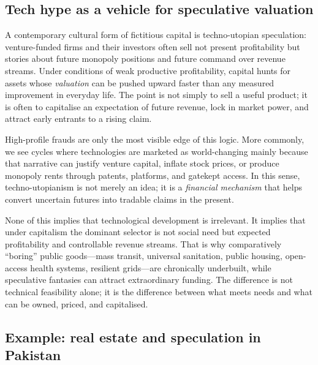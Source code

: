\subsection{Tech hype as a vehicle for speculative valuation}
\label{sec:tech-hype-fictitious}

A contemporary cultural form of fictitious capital is techno-utopian speculation: venture-funded firms and their investors often sell not present profitability but stories about future monopoly positions and future command over revenue streams. Under conditions of weak productive profitability, capital
hunts for assets whose \emph{valuation} can be pushed upward faster than any measured improvement
in everyday life. The point is not simply to sell a useful product; it is often to capitalise
an expectation of future revenue, lock in market power, and attract early entrants to a rising claim.

High-profile frauds are only the most visible edge of this logic. More commonly, we see cycles where
technologies are marketed as world-changing mainly because that narrative can justify venture capital,
inflate stock prices, or produce monopoly rents through patents, platforms, and gatekept access.
In this sense, techno-utopianism is not merely an idea; it is a \emph{financial mechanism} that helps
convert uncertain futures into tradable claims in the present.

None of this implies that technological development is irrelevant. It implies that under capitalism
the dominant selector is not social need but expected profitability and controllable revenue streams.
That is why comparatively ``boring'' public goods---mass transit, universal sanitation, public housing,
open-access health systems, resilient grids---are chronically underbuilt, while speculative fantasies
can attract extraordinary funding. The difference is not technical feasibility alone; it is the
difference between what meets needs and what can be owned, priced, and capitalised.

\subsection{Example: real estate and speculation in Pakistan}
\label{sec:pk-real-estate-speculation}

